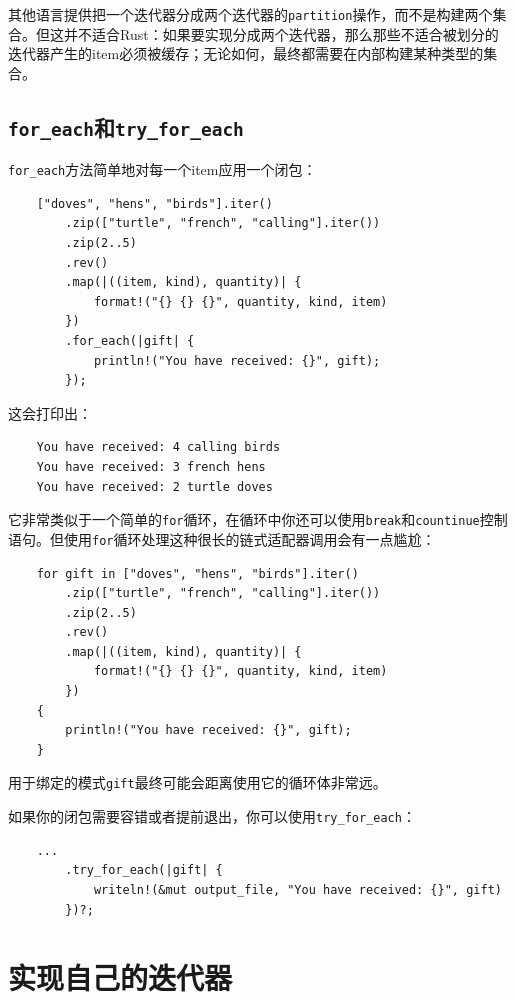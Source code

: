 其他语言提供把一个迭代器分成两个迭代器的\texttt{partition}操作，而不是构建两个集合。但这并不适合Rust：如果要实现分成两个迭代器，那么那些不适合被划分的迭代器产生的item必须被缓存；无论如何，最终都需要在内部构建某种类型的集合。

\subsection{\texttt{for\_each}和\texttt{try\_for\_each}}
\texttt{for\_each}方法简单地对每一个item应用一个闭包：
\begin{verbatim}
    ["doves", "hens", "birds"].iter()
        .zip(["turtle", "french", "calling"].iter())
        .zip(2..5)
        .rev()
        .map(|((item, kind), quantity)| {
            format!("{} {} {}", quantity, kind, item)
        })
        .for_each(|gift| {
            println!("You have received: {}", gift);
        });
\end{verbatim}

这会打印出：
\begin{verbatim}
    You have received: 4 calling birds
    You have received: 3 french hens
    You have received: 2 turtle doves
\end{verbatim}

它非常类似于一个简单的\texttt{for}循环，在循环中你还可以使用\texttt{break}和\texttt{countinue}控制语句。但使用\texttt{for}循环处理这种很长的链式适配器调用会有一点尴尬：
\begin{verbatim}
    for gift in ["doves", "hens", "birds"].iter()
        .zip(["turtle", "french", "calling"].iter())
        .zip(2..5)
        .rev()
        .map(|((item, kind), quantity)| {
            format!("{} {} {}", quantity, kind, item)
        })
    {
        println!("You have received: {}", gift);
    }
\end{verbatim}

用于绑定的模式\texttt{gift}最终可能会距离使用它的循环体非常远。

如果你的闭包需要容错或者提前退出，你可以使用\texttt{try\_for\_each}：
\begin{verbatim}
    ...
        .try_for_each(|gift| {
            writeln!(&mut output_file, "You have received: {}", gift)
        })?;
\end{verbatim}

\section{实现自己的迭代器}


